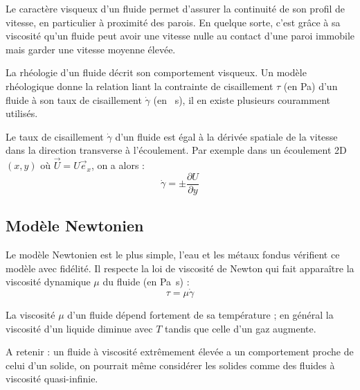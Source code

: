 Le caractère visqueux d'un fluide permet d'assurer la continuité de son profil de vitesse, en particulier à proximité des parois. En quelque sorte, c'est grâce à sa viscosité qu'un fluide peut avoir une vitesse nulle au contact d'une paroi immobile mais garder une vitesse moyenne élevée.

La rhéologie d'un fluide décrit son comportement visqueux. Un modèle rhéologique donne la relation liant la contrainte de cisaillement $\tau$ (en \si{\pascal}) d'un fluide à son taux de cisaillement $\dot{\gamma}$ (en \si{\per\second}), il en existe plusieurs couramment utilisés.

Le taux de cisaillement $\dot{\gamma}$ d'un fluide est égal à la dérivée spatiale de la vitesse dans la direction transverse à l'écoulement. Par exemple dans un écoulement 2D $(x,y)$ où $\vec{U} = U \vec{e}_x$, on a alors :
%
\begin{equation}
    \dot{\gamma} = \pm \frac{\partial U}{\partial y}
\end{equation}

\subsection{Modèle Newtonien}

Le modèle Newtonien est le plus simple, l'eau et les métaux fondus vérifient ce modèle avec fidélité. Il respecte la loi de viscosité de Newton qui fait apparaître la viscosité dynamique $\mu$ du fluide (en \si{\pascal\second}) :
%
\begin{equation}
    \tau = \mu \dot{\gamma}
\end{equation}

La viscosité $\mu$ d'un fluide dépend fortement de sa température ; en général la viscosité d'un liquide diminue avec $T$ tandis que celle d'un gaz augmente.

A retenir : un fluide à viscosité extrêmement élevée a un comportement proche de celui d'un solide, on pourrait même considérer les solides comme des fluides à viscosité quasi-infinie.
